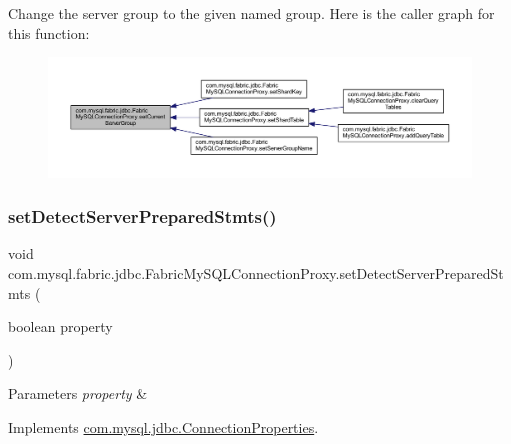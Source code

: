 Change the server group to the given named group. Here is the caller graph for this function\+:\nopagebreak
\begin{figure}[H]
\begin{center}
\leavevmode
\includegraphics[width=350pt]{classcom_1_1mysql_1_1fabric_1_1jdbc_1_1_fabric_my_s_q_l_connection_proxy_af555e33c27a54d2dbdc7e109f2b3c3a2_icgraph}
\end{center}
\end{figure}
\mbox{\label{classcom_1_1mysql_1_1fabric_1_1jdbc_1_1_fabric_my_s_q_l_connection_proxy_a4ecda277294f8d37b14e252d78a7062b}} 
\subsubsection{\texorpdfstring{set\+Detect\+Server\+Prepared\+Stmts()}{setDetectServerPreparedStmts()}}
{\footnotesize\ttfamily void com.\+mysql.\+fabric.\+jdbc.\+Fabric\+My\+S\+Q\+L\+Connection\+Proxy.\+set\+Detect\+Server\+Prepared\+Stmts (\begin{DoxyParamCaption}\item[{boolean}]{property }\end{DoxyParamCaption})}


\begin{DoxyParams}{Parameters}
{\em property} & \\
\hline
\end{DoxyParams}


Implements \mbox{\hyperlink{interfacecom_1_1mysql_1_1jdbc_1_1_connection_properties_aadfec3198248406f73aea1a634fc3839}{com.\+mysql.\+jdbc.\+Connection\+Properties}}.

